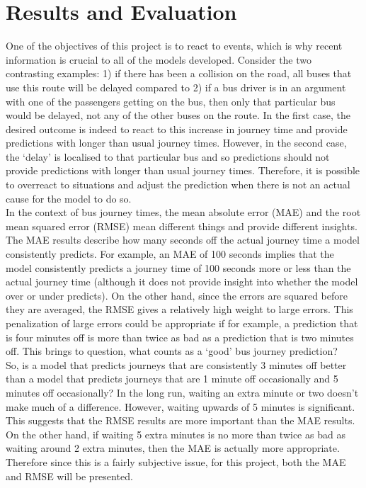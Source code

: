 \section{Results and Evaluation}

One of the objectives of this project is to react to events, which is why recent information is crucial to all of the models developed. Consider the two contrasting examples: 1) if there has been a collision on the road, all buses that use this route will be delayed compared to 2) if a bus driver is in an argument with one of the passengers getting on the bus, then only that particular bus would be delayed, not any of the other buses on the route. In the first case, the desired outcome is indeed to react to this increase in journey time and provide predictions with longer than usual journey times. However, in the second case, the `delay' is localised to that particular bus and so predictions should not provide predictions with longer than usual journey times. Therefore, it is possible to overreact to situations and adjust the prediction when there is not an actual cause for the model to do so. \\

In the context of bus journey times, the mean absolute error (MAE) and the root mean squared error (RMSE) mean different things and provide different insights. The MAE results describe how many seconds off the actual journey time a model consistently predicts. For example, an MAE of 100 seconds implies that the model consistently predicts a journey time of 100 seconds more or less than the actual journey time (although it does not provide insight into whether the model over or under predicts). On the other hand, since the errors are squared before they are averaged, the RMSE gives a relatively high weight to large errors. This penalization of large errors could be appropriate if for example, a prediction that is four minutes off is more than twice as bad as a prediction that is two minutes off. This brings to question, what counts as a `good' bus journey prediction? \\ 

So, is a model that predicts journeys that are consistently 3 minutes off better than a model that predicts journeys that are 1 minute off occasionally and 5 minutes off occasionally? In the long run, waiting an extra minute or two doesn't make much of a difference. However, waiting upwards of 5 minutes is significant. This suggests that the RMSE results are more important than the MAE results. On the other hand, if waiting 5 extra minutes is no more than twice as bad as waiting around 2 extra minutes, then the MAE is actually more appropriate. Therefore since this is a fairly subjective issue, for this project, both the MAE and RMSE will be presented. 

